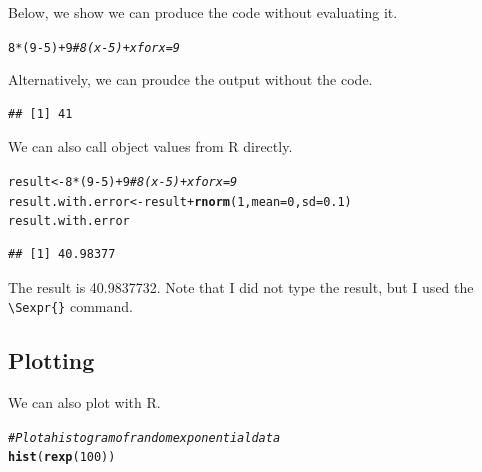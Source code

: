 \documentclass{article}\usepackage[]{graphicx}\usepackage[]{xcolor}
\makeatletter
\newcommand{\hlnum}[1]{\textcolor[rgb]{0.686,0.059,0.569}{#1}}%
\newcommand{\hlcom}[1]{\textcolor[rgb]{0.678,0.584,0.686}{\textit{#1}}}%
\newcommand{\hlopt}[1]{\textcolor[rgb]{0,0,0}{#1}}%
\newcommand{\hldef}[1]{\textcolor[rgb]{0.345,0.345,0.345}{#1}}%
\newcommand{\hlkwb}[1]{\textcolor[rgb]{0.69,0.353,0.396}{#1}}%
\newcommand{\hlkwc}[1]{\textcolor[rgb]{0.333,0.667,0.333}{#1}}%
\newcommand{\hlkwd}[1]{\textcolor[rgb]{0.737,0.353,0.396}{\textbf{#1}}}%
\newenvironment{kframe}{%
 \def\at@end@of@kframe{}%
 \ifinner\ifhmode%
  \def\at@end@of@kframe{\end{minipage}}%
  \begin{minipage}{\columnwidth}%
 \fi\fi%
 \def\FrameCommand##1{\hskip\@totalleftmargin \hskip-\fboxsep
 \colorbox{shadecolor}{##1}\hskip-\fboxsep
     \hskip-\linewidth \hskip-\@totalleftmargin \hskip\columnwidth}%
 \MakeFramed {\advance\hsize-\width
   \@totalleftmargin\z@ \linewidth\hsize
   \@setminipage}}%
 {\par\unskip\endMakeFramed%
 \at@end@of@kframe}
\newenvironment{knitrout}{}{} %
\makeatother
\begin{document}
\begin{multicols}{2}
Below, we show we can produce the code without evaluating it. 
\begin{knitrout}\scriptsize
{}\color{fgcolor}\begin{kframe}
\begin{alltt}
\hlnum{8}\hlopt{*}\hldef{(}\hlnum{9}\hlopt{-}\hlnum{5}\hldef{)} \hlopt{+} \hlnum{9} \hlcom{# 8(x-5) + x for x=9}
\end{alltt}
\end{kframe}
\end{knitrout}

Alternatively, we can proudce the output without the code. 
\begin{knitrout}\scriptsize
{}\color{fgcolor}\begin{kframe}
\begin{verbatim}
## [1] 41
\end{verbatim}
\end{kframe}
\end{knitrout}

We can also call object values from R directly.
\begin{knitrout}\scriptsize
{}\color{fgcolor}\begin{kframe}
\begin{alltt}
\hldef{result}\hlkwb{<-} \hlnum{8}\hlopt{*}\hldef{(}\hlnum{9}\hlopt{-}\hlnum{5}\hldef{)}\hlopt{+}\hlnum{9} \hlcom{# 8(x-5)+x for x=9}
\hldef{result.with.error}\hlkwb{<-} \hldef{result} \hlopt{+} \hlkwd{rnorm}\hldef{(}\hlnum{1}\hldef{,} \hlkwc{mean}\hldef{=}\hlnum{0}\hldef{,} \hlkwc{sd}\hldef{=}\hlnum{0.1}\hldef{)}
\hldef{result.with.error}
\end{alltt}
\begin{verbatim}
## [1] 40.98377
\end{verbatim}
\end{kframe}
\end{knitrout}

The result is 40.9837732. Note that I did not type the result, but I used the \verb|\Sexpr{}| command.

\subsection{Plotting}
\noindent We can also plot with R.
\begin{knitrout}\scriptsize
{}\color{fgcolor}\begin{kframe}
\begin{alltt}
\hlcom{#Plot a histogram of random exponential data}
\hlkwd{hist}\hldef{(}\hlkwd{rexp}\hldef{(}\hlnum{100}\hldef{))}
\end{alltt}
\end{kframe}
\end{knitrout}


\end{multicols}
\end{document}
